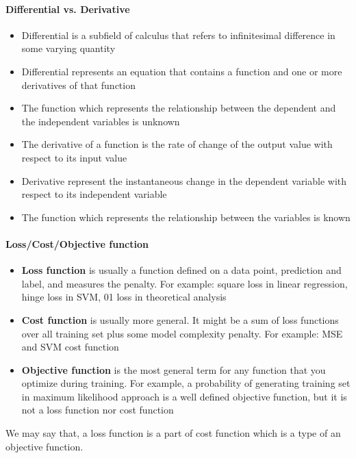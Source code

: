 \documentclass[sutton_barto_notes.tex]{subfiles}
\begin{document}
\paragraph{Differential vs. Derivative}
\begin{itemize}
\item Differential is a subfield of calculus that refers to infinitesimal difference in some varying quantity
\item Differential represents an equation that contains a function and one or more derivatives of that function
\item The function which represents the relationship between the dependent and the independent variables is unknown
\end{itemize}

\begin{itemize}
\item The derivative of a function is the rate of change of the output value with respect to its input value
\item Derivative represent the instantaneous change in the dependent variable with respect to its independent variable
\item The function which represents the relationship between the variables is known
\end{itemize}


\paragraph{Loss/Cost/Objective function}

\begin{itemize}
\item \textbf{Loss function} is usually a function defined on a data point, prediction and label, and measures the penalty. For example: square loss in linear regression, hinge loss in SVM, 01 loss in theoretical analysis
\item \textbf{Cost function} is usually more general. It might be a sum of loss functions over all training set plus some model complexity penalty. For example: MSE and SVM cost function
\item \textbf{Objective function} is the most general term for any function that you optimize during training. For example, a probability of generating training set in maximum likelihood approach is a well defined objective function, but it is not a loss function nor cost function
\end{itemize}

We may say that, a loss function is a part of cost function which is a type of an objective function.
\end{document}
